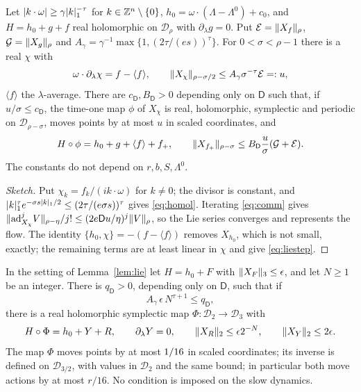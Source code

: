 \begin{lemma}
\label{lem:lie}
Let $\lvert k\cdot\omega\rvert\ge\gamma\lvert k\rvert_1^{-\tau}$ for $k\in\mathbb{Z}^n\setminus\{0\}$, $h_0=\omega\cdot(\Lambda-\Lambda^0)+c_0$, and $H=h_0+g+f$ real holomorphic on $\mathcal D_\rho$ with $\partial_\lambda g=0$. Put $\mathcal E=\lVert X_f\rVert_\rho$, $\mathcal G=\lVert X_g\rVert_\rho$ and $A_\gamma=\gamma^{-1}\max\{1,(2\tau/(es))^\tau\}$. For $0<\sigma<\rho-1$ there is a real $\chi$ with
\begin{equation}
\label{eq:homol}
\omega\cdot\partial_\lambda\chi=f-\langle f\rangle,\qquad \lVert X_\chi\rVert_{\rho-\sigma/2}\le A_\gamma\sigma^{-\tau}\mathcal E=:u,
\end{equation}
$\langle f\rangle$ the $\lambda$-average. There are $c_{\mathsf D},B_{\mathsf D}>0$ depending only on $\mathsf D$ such that, if $u/\sigma\le c_{\mathsf D}$, the time-one map $\phi$ of $X_\chi$ is real, holomorphic, symplectic and periodic on $\mathcal D_{\rho-\sigma}$, moves points by at most $u$ in scaled coordinates, and
\begin{equation}
\label{eq:liestep}
H\circ\phi=h_0+g+\langle f\rangle+f_+,\qquad \lVert X_{f_+}\rVert_{\rho-\sigma}\le B_{\mathsf D}\frac u\sigma(\mathcal G+\mathcal E).
\end{equation}
The constants do not depend on $r,b,S,\Lambda^0$.
\end{lemma}

\begin{proof}[Sketch]
Put $\chi_k=f_k/(ik\cdot\omega)$ for $k\ne0$; the divisor is constant, and $\lvert k\rvert_1^\tau e^{-\sigma s\lvert k\rvert_1/2}\le(2\tau/(e\sigma s))^\tau$ gives \eqref{eq:homol}. Iterating \eqref{eq:comm} gives $\lVert \mathrm{ad}_{X_\chi}^jV\rVert_{\rho-\eta}/j!\le(2e\mathsf Du/\eta)^j\lVert V\rVert_\rho$, so the Lie series converges and represents the flow. The identity $\{h_0,\chi\}=-(f-\langle f\rangle)$ removes $X_{h_0}$, which is not small, exactly; the remaining terms are at least linear in $\chi$ and give \eqref{eq:liestep}.
\end{proof}

\begin{lemma}
\label{lem:nf}
In the setting of Lemma~\ref{lem:lie} let $H=h_0+F$ with $\lVert X_F\rVert_3\le\epsilon$, and let $N\ge1$ be an integer. There is $q_{\mathsf D}>0$, depending only on $\mathsf D$, such that if
\begin{equation}
\label{eq:nfcond}
A_\gamma\,\epsilon\,N^{\tau+1}\le q_{\mathsf D},
\end{equation}
there is a real holomorphic symplectic map $\Phi:\mathcal D_2\to\mathcal D_3$ with
\begin{equation}
\label{eq:nf}
H\circ\Phi=h_0+Y+R,\qquad \partial_\lambda Y=0,\qquad \lVert X_R\rVert_2\le\epsilon2^{-N},\qquad \lVert X_Y\rVert_2\le2\epsilon.
\end{equation}
The map $\Phi$ moves points by at most $1/16$ in scaled coordinates; its inverse is defined on $\mathcal D_{3/2}$, with values in $\mathcal D_2$ and the same bound; in particular both move actions by at most $r/16$. No condition is imposed on the slow dynamics.
\end{lemma}

